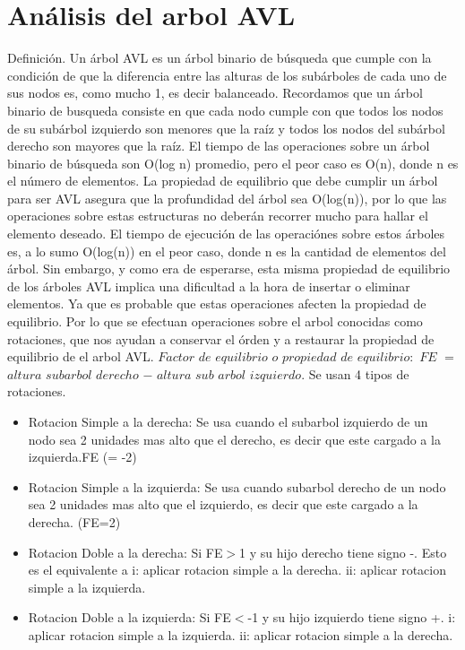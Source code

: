 \documentclass[12pt,letterpaper]{article}
\begin{document}
\section{Análisis del arbol AVL}
\vskip 0.4cm
Definición. Un árbol AVL es un árbol binario de búsqueda que cumple con la condición de que la diferencia entre las alturas de los subárboles de cada uno de sus nodos es, como mucho 1, es decir balanceado.
\vskip 0.4cm
Recordamos que un árbol binario de busqueda consiste en que cada nodo cumple con que todos los nodos de su subárbol izquierdo son menores que la raíz y todos los nodos del subárbol derecho son mayores que la raíz.
\vskip 0.4cm
El tiempo de las operaciones sobre un árbol binario de búsqueda son O(log n) promedio, pero el peor caso es O(n), donde n es el número de
elementos.
\vskip 0.4cm
La propiedad de equilibrio que debe cumplir un árbol para ser AVL asegura que la profundidad del árbol sea O(log(n)), por lo que las operaciones sobre estas estructuras no deberán recorrer mucho para hallar el elemento deseado. 
\vskip 0.4cm
El tiempo de ejecución de las operaciónes sobre estos árboles es, a lo sumo O(log(n)) en el peor caso, donde n es la cantidad de elementos del árbol. Sin embargo, y como era de esperarse, esta misma propiedad de equilibrio de los árboles AVL implica una dificultad a la hora de insertar o eliminar elementos. Ya que es probable que estas operaciones afecten la propiedad de equilibrio.
\vskip 0.4cm
Por lo que se efectuan operaciones sobre el arbol conocidas como rotaciones, que nos ayudan a conservar el órden y a restaurar la propiedad de equilibrio de el arbol AVL.
\vskip 0.4cm 
$Factor$ $de$ $equilibrio$ $o$ $propiedad$ $de$ $equilibrio:$ $FE$ $=$ $altura$ $subarbol$ $derecho$ $-$ $altura$ $sub$ $arbol$ $izquierdo$.
\vskip 0.4cm 
Se usan 4 tipos de rotaciones.
\begin{itemize}
\item Rotacion Simple a la derecha: Se usa cuando el subarbol izquierdo de un nodo sea 2 unidades mas alto que el derecho, es decir que este cargado a la izquierda.FE (= -2)
\item Rotacion Simple a la izquierda: Se usa cuando subarbol derecho de un nodo sea 2 unidades mas alto que el izquierdo, es decir que este cargado a la derecha. (FE=2)
\item Rotacion Doble a la derecha:   Si FE$>$1 y su hijo derecho tiene signo -. Esto es el equivalente a 
i: aplicar rotacion simple a la derecha. ii: aplicar rotacion simple a la izquierda.
\item Rotacion Doble a la izquierda: Si FE$<$-1 y su hijo izquierdo tiene signo +.
i: aplicar rotacion simple a la izquierda. ii: aplicar rotacion simple a la derecha.
\end{itemize}
\newpage
\end{document}
